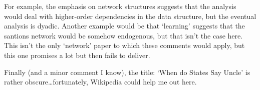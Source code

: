 For example, the emphasis on network structures suggests that the analysis would deal with higher-order dependencies in the data structure, but the eventual analysis is dyadic. Another example would be that ‘learning’ suggests that the santions network would be somehow endogenous, but that isn’t the case here. This isn’t the only ‘network’ paper to which these comments would apply, but this one promises a lot but then fails to deliver.

Finally (and a minor comment I know), the title: ‘When do States Say Uncle’ is rather obscure…fortunately, Wikipedia could help me out here.